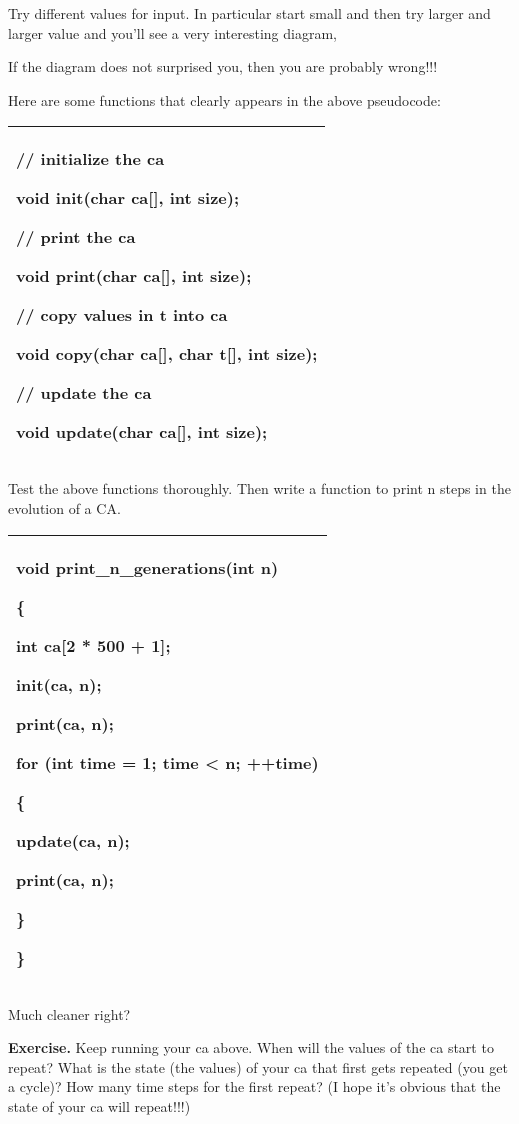 \documentclass[
]{article}
\begin{document}
Try different values for input. In particular start small and then try
larger and larger value and you'll see a very interesting diagram,

If the diagram does not surprised you, then you are probably wrong!!!

Here are some functions that clearly appears in the above pseudocode:

\begin{longtable}[]{@{}l@{}}
\toprule
\endhead
\begin{minipage}[t]{0.97\columnwidth}\raggedright
// initialize the ca

void init(char ca{[}{]}, int size);

// print the ca

void print(char ca{[}{]}, int size);

// copy values in t into ca

void copy(char ca{[}{]}, char t{[}{]}, int size);

// update the ca

void update(char ca{[}{]}, int size); \strut
\end{minipage}\tabularnewline
\bottomrule
\end{longtable}

Test the above functions thoroughly. Then write a function to print n
steps in the evolution of a CA.

\begin{longtable}[]{@{}l@{}}
\toprule
\endhead
\begin{minipage}[t]{0.97\columnwidth}\raggedright
void print\_n\_generations(int n)

\{

int ca{[}2 * 500 + 1{]};

init(ca, n);

print(ca, n);

for (int time = 1; time \textless{} n; ++time)

\{

update(ca, n);

print(ca, n);

\}

\}\strut
\end{minipage}\tabularnewline
\bottomrule
\end{longtable}

Much cleaner right?

\textbf{Exercise.} Keep running your ca above. When will the values of
the ca start to repeat? What is the state (the values) of your ca that
first gets repeated (you get a cycle)? How many time steps for the first
repeat? (I hope it's obvious that the state of your ca will repeat!!!)
\end{document}
